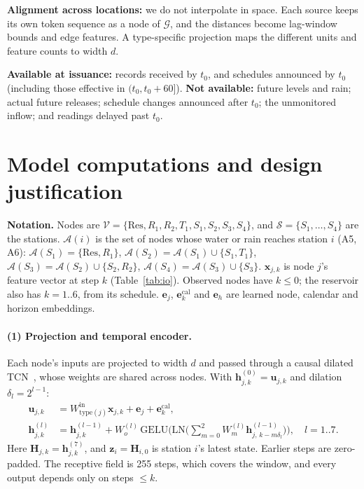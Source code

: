 \documentclass[11pt,a4paper]{article}
\newcommand{\A}{\mathcal{A}}
\newcommand{\Res}{\mathrm{Res}}
\begin{document}
\textbf{Alignment across locations:} we do not interpolate in space. Each
source keeps its own token sequence as a node of $\mathcal{G}$, and the
distances become lag-window bounds and edge features. A type-specific
projection maps the different units and feature counts to width $d$.

\textbf{Available at issuance:} records received by $t_0$, and schedules
announced by $t_0$ (including those effective in $(t_0,t_0+60]$).
\textbf{Not available:} future levels and rain; actual future releases;
schedule changes announced after $t_0$; the unmonitored inflow; and readings
delayed past $t_0$.

\section{Model computations and design justification}\label{sec:model}
\textbf{Notation.} Nodes are
$\mathcal{V}=\{\Res,R_1,R_2,T_1,S_1,S_2,S_3,S_4\}$, and
$\mathcal{S}=\{S_1,\dots,S_4\}$ are the stations. $\A(i)$ is the set of nodes
whose water or rain reaches station $i$ (A5, A6):
$\A(S_1)=\{\Res,R_1\}$, $\A(S_2)=\A(S_1)\cup\{S_1,T_1\}$,
$\A(S_3)=\A(S_2)\cup\{S_2,R_2\}$, $\A(S_4)=\A(S_3)\cup\{S_3\}$.
$\mathbf{x}_{j,k}$ is node $j$'s feature vector at step $k$
(Table~\ref{tab:io}). Observed nodes have $k\le0$; the reservoir also has
$k=1..6$, from its schedule. $\mathbf{e}_j$, $\mathbf{e}^{\mathrm{cal}}_k$ and
$\mathbf{e}_h$ are learned node, calendar and horizon embeddings.

\paragraph{(1) Projection and temporal encoder.} Each node's inputs are
projected to width $d$ and passed through a causal dilated TCN~\cite{tcn},
whose weights are shared across nodes. With
$\mathbf{h}^{(0)}_{j,k}=\mathbf{u}_{j,k}$ and dilation $\delta_l=2^{l-1}$:
\begin{equation}
\begin{aligned}
  \mathbf{u}_{j,k} &= W^{\mathrm{in}}_{\mathrm{type}(j)}\mathbf{x}_{j,k} + \mathbf{e}_j + \mathbf{e}^{\mathrm{cal}}_k,\\
  \mathbf{h}^{(l)}_{j,k} &= \mathbf{h}^{(l-1)}_{j,k}
  + W^{(l)}_{o}\,\mathrm{GELU}\Big(\mathrm{LN}\Big(\textstyle\sum_{m=0}^{2}
     W^{(l)}_{m}\mathbf{h}^{(l-1)}_{j,\,k-m\delta_l}\Big)\Big),\quad l=1..7.
\end{aligned}
  \label{eq:tcn}
\end{equation}
Here $\mathbf{H}_{j,k}=\mathbf{h}^{(7)}_{j,k}$, and
$\mathbf{z}_i=\mathbf{H}_{i,0}$ is station $i$'s latest state. Earlier steps
are zero-padded. The receptive field is 255 steps, which covers the window,
and every output depends only on steps $\le k$.
\end{document}
